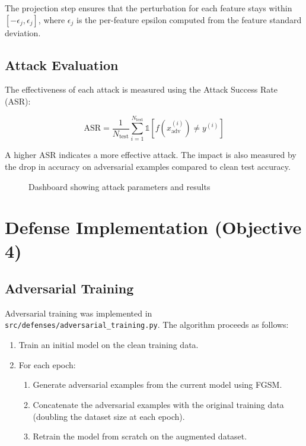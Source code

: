 \documentclass[12pt,a4paper,oneside]{report}
\begin{document}
The projection step ensures that the perturbation for each feature stays within $[-\epsilon_j, \epsilon_j]$, where $\epsilon_j$ is the per-feature epsilon computed from the feature standard deviation.

\subsection{Attack Evaluation}

The effectiveness of each attack is measured using the Attack Success Rate (ASR):

\begin{equation}
    \label{eq:asr2}
    \text{ASR} = \frac{1}{N_{\text{test}}} \sum_{i=1}^{N_{\text{test}}} \mathbb{1}\left[f(x_{\text{adv}}^{(i)}) \neq y^{(i)}\right]
\end{equation}

\noindent A higher ASR indicates a more effective attack. The impact is also measured by the drop in accuracy on adversarial examples compared to clean test accuracy.

\begin{figure}[H]
    \centering
    \caption{Dashboard showing attack parameters and results}\label{fig:attack_results}
\end{figure}

\section{Defense Implementation (Objective 4)}

\subsection{Adversarial Training}

Adversarial training was implemented in \texttt{src/defenses/adversarial\_training.py}. The algorithm proceeds as follows:

\begin{enumerate}
    \item Train an initial model on the clean training data.
    \item For each epoch:
    \begin{enumerate}
        \item Generate adversarial examples from the current model using FGSM.
        \item Concatenate the adversarial examples with the original training data (doubling the dataset size at each epoch).
        \item Retrain the model from scratch on the augmented dataset.
    \end{enumerate}
\end{enumerate}
\end{document}
